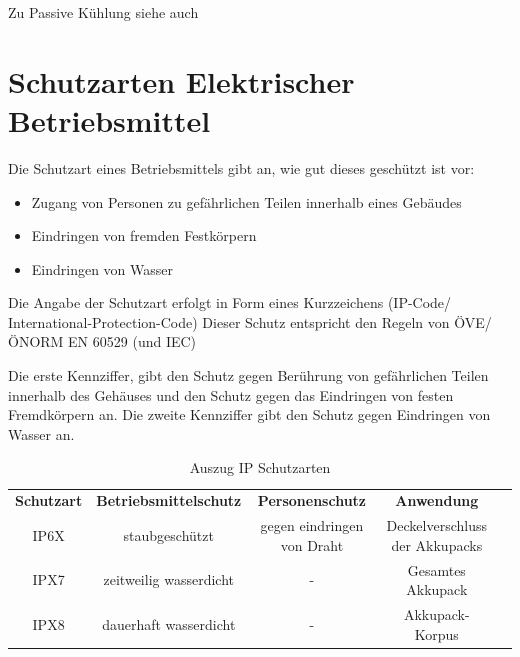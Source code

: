 Zu Passive Kühlung siehe auch \cite{PassiveKuehlung}


\newpage

\section{Schutzarten Elektrischer Betriebsmittel} 

Die Schutzart eines Betriebsmittels gibt an, wie gut dieses geschützt ist vor:
\begin{itemize}
	\item Zugang von Personen zu gefährlichen Teilen innerhalb eines Gebäudes
	\item Eindringen von fremden Festkörpern
	\item Eindringen von Wasser
\end{itemize}
 
Die Angabe der Schutzart erfolgt in Form eines Kurzzeichens (IP-Code/ International-Protection-Code)
Dieser Schutz entspricht den Regeln von ÖVE/ÖNORM EN 60529 (und IEC)

Die erste Kennziffer, gibt den Schutz gegen Berührung von gefährlichen Teilen innerhalb des Gehäuses und den Schutz gegen das Eindringen von festen Fremdkörpern an.
Die zweite Kennziffer gibt den Schutz gegen Eindringen von Wasser an.

\begin{table}[H]
	\begin{tabular}{|c|c|c|c|l}
\cline{1-4}
		\textbf{Schutzart} & \textbf{Betriebsmittelschutz} & \textbf{Personenschutz}    & \textbf{Anwendung}             &  \\ \cline{1-4}
		IP6X               & staubgeschützt                & gegen eindringen von Draht & Deckelverschluss der Akkupacks &  \\ \cline{1-4}
		IPX7               & zeitweilig wasserdicht        & -                          & Gesamtes Akkupack              &  \\ \cline{1-4}
		IPX8               & dauerhaft wasserdicht         & -                          & Akkupack-Korpus                &  \\ \cline{1-4}
	\end{tabular}
	\caption{Auszug IP Schutzarten}
\end{table}

